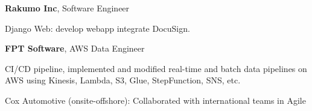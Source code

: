 


\begin{twocolentry}{
	}
	\textbf{Rakumo Inc}, Software Engineer
	\begin{highlights}
		\item Django Web: develop webapp integrate DocuSign.
	\end{highlights}
\end{twocolentry}

\begin{twocolentry}{
	}
	\textbf{FPT Software}, AWS Data Engineer
	
	\begin{highlights}
		\item CI/CD pipeline, implemented and modified real-time and batch data pipelines on AWS using Kinesis, Lambda, S3, Glue, StepFunction, SNS, etc.
		\item Cox Automotive (onsite-offshore): Collaborated with international teams in Agile
	\end{highlights}
	
	
\end{twocolentry}

